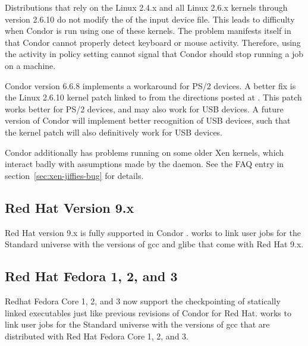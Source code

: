 Distributions that rely on the Linux 2.4.x and all Linux 2.6.x kernels
through version 2.6.10
do not modify the  of the input device file.
This leads to difficulty when Condor is run using one of these
kernels. 
The problem manifests itself in that Condor cannot properly
detect keyboard or mouse activity.
Therefore, using the activity in policy setting cannot
signal that Condor should stop running a job on a machine.

Condor version 6.6.8 implements a workaround for PS/2 devices.
A better fix is the Linux 2.6.10 kernel
patch linked to from the directions posted at
.
This patch works better for PS/2 devices, and
may also work for USB devices.
A future version of Condor will implement better recognition
of USB devices,
such that the kernel patch will also definitively work for USB devices.

Condor additionally has problems running on some older Xen kernels,
which interact badly with assumptions made by the 
daemon. See the FAQ entry in section~\ref{sec:xen-jiffies-bug} for
details.

\subsection{\label{sec:platform-linux-rh9}Red Hat Version 9.x}

Red Hat version 9.x is fully supported in Condor \VersionNotice.
 works to link user jobs for the Standard universe
with the versions of gcc and glibc that come with Red Hat 9.x.

\subsection{\label{sec:platform-linux-fed}Red Hat Fedora 1, 2, and 3}

Redhat Fedora Core 1, 2, and 3 now support the checkpointing of statically
linked executables just like previous revisions of Condor for Red Hat.
 works to link user jobs for the Standard universe with
the versions of gcc that are distributed with Red Hat Fedora Core 1, 2,
and 3.

